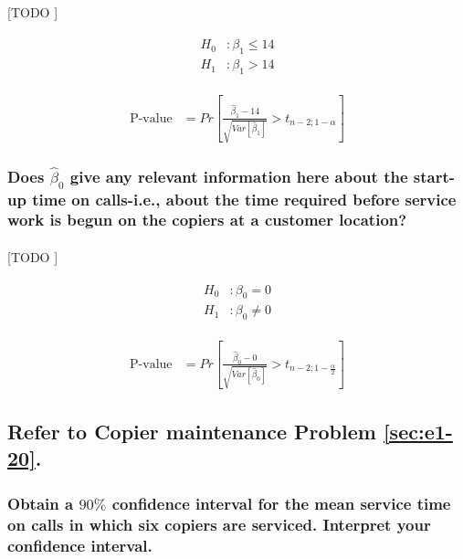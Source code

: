 \documentclass{article}
\begin{document}
        \paragraph{}
        [TODO ]

        \begin{align}
          \begin{split}
            H_0&: \beta_1 \leq 14 \\
            H_1&: \beta_1 > 14
          \end{split}
        \end{align}

        \begin{align}
          \text{P-value} &= Pr\left[\frac{\widehat{\beta}_1 - 14}{\sqrt{Var\left[\widehat{\beta}_1\right]}} > t_{n-2;1-\alpha}\right]
        \end{align}


      \subsubsection{Does $\widehat{\beta}_0$ give any relevant information here about the start-up time on calls-i.e., about the time required before service work is begun on the copiers at a customer location?}

        \paragraph{}
        [TODO ]

        \begin{align}
          \begin{split}
            H_0&: \beta_0 = 0 \\
            H_1&: \beta_0 \neq 0
          \end{split}
        \end{align}

        \begin{align}
          \text{P-value} &= Pr\left[\frac{\widehat{\beta}_0 - 0}{\sqrt{Var\left[\widehat{\beta}_0\right]}} > t_{n-2;1-\frac{\alpha}{2}}\right]
        \end{align}

    \setcounter{subsection}{13}
    \subsection{Refer to \textbf{Copier maintenance} Problem \ref{sec:e1-20}.}

      \subsubsection{Obtain a $90\%$ confidence interval for the mean service time on calls in which six copiers are serviced. Interpret your confidence interval.}
      \label{sec:copiers-2.14a}
\end{document}
